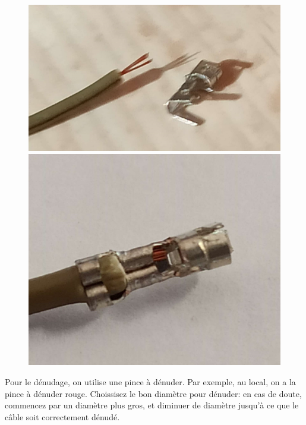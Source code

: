 \documentclass{article}
\begin{document}
\begin{figure}[h]
    \begin{minipage}{0.45\textwidth}
        \centering
        \includegraphics[width=\linewidth]{images/apres_denudage.jpg}
        \captionsetup{labelformat=empty}
        \caption{}
        \label{fig:image1}
    \end{minipage}
    \hfill
    \begin{minipage}{0.45\textwidth}
        \centering
        \includegraphics[width=\linewidth]{images/sertissage_finit.jpg}
        \captionsetup{labelformat=empty}
        \caption{}
        \label{fig:image2}
    \end{minipage}
\end{figure}

Pour le dénudage, on utilise une pince à dénuder. Par exemple, au local, on a la pince à dénuder rouge. Choissisez le bon diamètre pour dénuder: en cas de doute, commencez par un diamètre plus gros, et diminuer de diamètre jusqu'à ce que le câble soit correctement dénudé.
\end{document}
